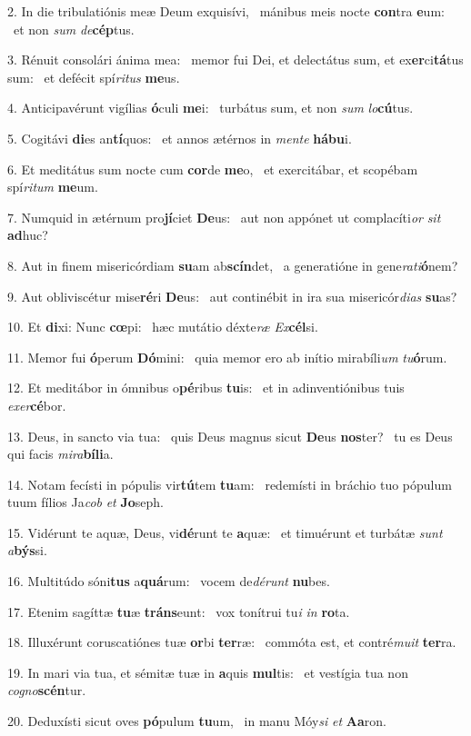 2. In die tribulatiónis meæ Deum exquisívi, \dag\  mánibus meis nocte \textbf{con}tra \textbf{e}um: \ast\  et non \textit{sum} \textit{de}\textbf{cép}tus.\

3. Rénuit consolári ánima mea: \dag\  memor fui Dei, et delectátus sum, et ex\textbf{er}ci\textbf{tá}tus sum: \ast\  et defécit spí\textit{ri}\textit{tus} \textbf{me}us.\

4. Anticipavérunt vigílias \textbf{ó}culi \textbf{me}i: \ast\  turbátus sum, et non \textit{sum} \textit{lo}\textbf{cú}tus.\

5. Cogitávi \textbf{di}es an\textbf{tí}quos: \ast\  et annos ætérnos in \textit{men}\textit{te} \textbf{há}\textbf{bu}i.\

6. Et meditátus sum nocte cum \textbf{cor}de \textbf{me}o, \ast\  et exercitábar, et scopébam spí\textit{ri}\textit{tum} \textbf{me}um.\

7. Numquid in ætérnum pro\textbf{jí}ciet \textbf{De}us: \ast\  aut non appónet ut complacíti\textit{or} \textit{sit} \textbf{ad}huc?\

8. Aut in finem misericórdiam \textbf{su}am ab\textbf{scín}det, \ast\  a generatióne in gene\textit{ra}\textit{ti}\textbf{ó}nem?\

9. Aut obliviscétur mise\textbf{ré}ri \textbf{De}us: \ast\  aut continébit in ira sua misericór\textit{di}\textit{as} \textbf{su}as?\

10. Et \textbf{di}xi: Nunc \textbf{cœ}pi: \ast\  hæc mutátio déxte\textit{ræ} \textit{Ex}\textbf{cél}si.\

11. Memor fui \textbf{ó}perum \textbf{Dó}mini: \ast\  quia memor ero ab inítio mirabíli\textit{um} \textit{tu}\textbf{ó}rum.\

12. Et meditábor in ómnibus o\textbf{pé}ribus \textbf{tu}is: \ast\  et in adinventiónibus tuis \textit{ex}\textit{er}\textbf{cé}bor.\

13. Deus, in sancto via tua: \dag\  quis Deus magnus sicut \textbf{De}us \textbf{nos}ter? \ast\  tu es Deus qui facis \textit{mi}\textit{ra}\textbf{bí}\textbf{li}a.\

14. Notam fecísti in pópulis vir\textbf{tú}tem \textbf{tu}am: \ast\  redemísti in bráchio tuo pópulum tuum fílios Ja\textit{cob} \textit{et} \textbf{Jo}seph.\

15. Vidérunt te aquæ, Deus, vi\textbf{dé}runt te \textbf{a}quæ: \ast\  et timuérunt et turbátæ \textit{sunt} \textit{a}\textbf{býs}si.\

16. Multitúdo sóni\textbf{tus} a\textbf{quá}rum: \ast\  vocem de\textit{dé}\textit{runt} \textbf{nu}bes.\

17. Etenim sagíttæ \textbf{tu}æ \textbf{tráns}eunt: \ast\  vox tonítrui tu\textit{i} \textit{in} \textbf{ro}ta.\

18. Illuxérunt coruscatiónes tuæ \textbf{or}bi \textbf{ter}ræ: \ast\  commóta est, et contré\textit{mu}\textit{it} \textbf{ter}ra.\

19. In mari via tua, et sémitæ tuæ in \textbf{a}quis \textbf{mul}tis: \ast\  et vestígia tua non \textit{co}\textit{gno}\textbf{scén}tur.\

20. Deduxísti sicut oves \textbf{pó}pulum \textbf{tu}um, \ast\  in manu Móy\textit{si} \textit{et} \textbf{A}\textbf{a}ron.\

